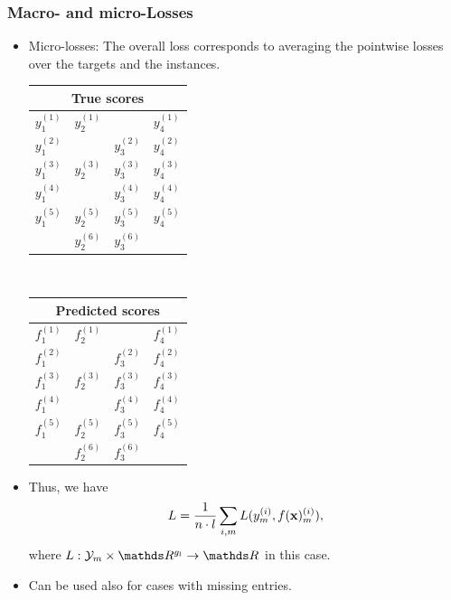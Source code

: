 \documentclass[11pt,compress,t,notes=noshow, xcolor=table]{beamer}
\begin{document}
\begin{frame}
	\frametitle{Macro- and micro-Losses}
	
	\begin{itemize}
		\item<1-> Micro-losses: The overall loss corresponds to averaging the pointwise losses over the targets and the instances.
		
				\begin{center}
			\begin{tabular}{|c|c|c|c|}
				\multicolumn{4}{c}{True scores} \\
				\hline
				\color{putred}$y_1^{(1)}$ & \color{putred}$y_2^{(1)}$ & & \color{putred}$y_4^{(1)}$ \\
				\color{putred}$y_1^{(2)}$ & & \color{putred}$y_3^{(2)}$ & \color{putred}$y_4^{(2)}$ \\
				\color{putred}$y_1^{(3)}$ & \color{putred}$y_2^{(3)}$ & \color{putred}$y_3^{(3)}$ & \color{putred}$y_4^{(3)}$ \\
				\color{putred}$y_1^{(4)}$ &  & \color{putred}$y_3^{(4)}$ & \color{putred}$y_4^{(4)}$ \\
				\color{putred}$y_1^{(5)}$ & \color{putred}$y_2^{(5)}$ & \color{putred}$y_3^{(5)}$ & \color{putred}$y_4^{(5)}$ \\
				& \color{putred}$y_2^{(6)}$ & \color{putred}$y_3^{(6)}$ & \\
				\hline
			\end{tabular}
			$\quad$
			\begin{tabular}{|c|c|c|c|}
				\multicolumn{4}{c}{Predicted scores} \\
				\hline
				\color{putred}$f_1^{(1)}$ & \color{putred}$f_2^{(1)}$ &  & \color{putred}$f_4^{(1)}$ \\
				\color{putred}$f_1^{(2)}$ &  & \color{putred}$f_3^{(2)}$ & \color{putred}$f_4^{(2)}$ \\
				\color{putred}$f_1^{(3)}$ & \color{putred}$f_2^{(3)}$ & \color{putred}$f_3^{(3)}$ & \color{putred}$f_4^{(3)}$ \\
				\color{putred}$f_1^{(4)}$ & & \color{putred}$f_3^{(4)}$ & \color{putred}$f_4^{(4)}$ \\
				\color{putred}$f_1^{(5)}$ & \color{putred}$f_2^{(5)}$ & \color{putred}$f_3^{(5)}$ & \color{putred}$f_4^{(5)}$ \\
				& \color{putred}$f_2^{(6)}$ & \color{putred}$f_3^{(6)}$ & \\
				\hline
			\end{tabular}
		\end{center}
	\lz
	\item Thus, we have	
	$$
	L = \frac{1}{n \cdot l} \sum_{i,m} L(y_m^{(i)} , f(\mathbf{x})_m^{(i)}),
	$$
	where $L: \Yspace_m \times \R^{g_l} \to \R$ in this case.
%	
	\item 	
		Can be used also for cases with missing entries.
	\end{itemize}
 

	
\end{frame}
\end{document}
